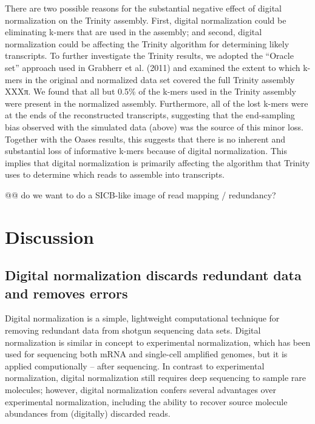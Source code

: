 \documentclass[10pt]{article}
\begin{document}
There are two possible reasons for the substantial negative effect of
digital normalization on the Trinity assembly.  First, digital
normalization could be eliminating k-mers that are used in the
assembly; and second, digital normalization could be affecting the
Trinity algorithm for determining likely transcripts.  To further
investigate the Trinity results, we adopted the ``Oracle set''
approach used in Grabherr et al. (2011) and examined the extent to
which k-mers in the original and normalized data set covered the full
Trinity assembly XXXπ.  We found that all but 0.5\% of the k-mers used in
the Trinity assembly were present in the normalized assembly.
Furthermore, all of the lost k-mers were at the ends of the
reconstructed transcripts, suggesting that the end-sampling bias
observed with the simulated data (above) was the source of this minor loss.
Together with the Oases results, this suggests that there is no
inherent and substantial loss of informative k-mers because of digital
normalization.  This implies that digital normalization is primarily
affecting the algorithm that Trinity uses to determine which reads to
assemble into transcripts.


@@ do we want to do a SICB-like image of read mapping / redundancy?

\section*{Discussion}

\subsection*{Digital normalization discards redundant data and removes errors}

Digital normalization is a simple, lightweight computational technique
for removing redundant data from shotgun sequencing data sets.
Digital normalization is similar in concept to experimental
normalization, which has been used for sequencing both mRNA and
single-cell amplified genomes, but it is applied computionally --
after sequencing.  In contrast to experimental normalization, digital
normalization still requires deep sequencing to sample rare molecules;
however, digital normalization confers several advantages over
experimental normalization, including the ability to recover source
molecule abundances from (digitally) discarded reads.
\end{document}
